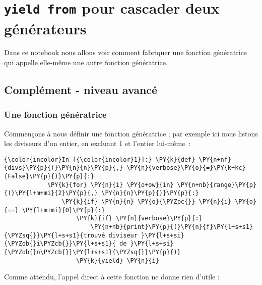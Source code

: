     
    
    
    

    

    \hypertarget{yield-from-pour-cascader-deux-guxe9nuxe9rateurs}{%
\section{\texorpdfstring{\texttt{yield\ from} pour cascader deux
générateurs}{yield from pour cascader deux générateurs}}\label{yield-from-pour-cascader-deux-guxe9nuxe9rateurs}}

    Dans ce notebook nous allons voir comment fabriquer une fonction
génératrice qui appelle elle-même une autre fonction génératrice.

    \hypertarget{compluxe9ment---niveau-avancuxe9}{%
\subsection{Complément - niveau
avancé}\label{compluxe9ment---niveau-avancuxe9}}

    \hypertarget{une-fonction-guxe9nuxe9ratrice}{%
\subsubsection{Une fonction
génératrice}\label{une-fonction-guxe9nuxe9ratrice}}

    Commençons à nous définir une fonction génératrice ; par exemple ici
nous listons les diviseurs d'un entier, en excluant 1 et l'entier
lui-même~:

    \begin{Verbatim}[commandchars=\\\{\}]
{\color{incolor}In [{\color{incolor}1}]:} \PY{k}{def} \PY{n+nf}{divs}\PY{p}{(}\PY{n}{n}\PY{p}{,} \PY{n}{verbose}\PY{o}{=}\PY{k+kc}{False}\PY{p}{)}\PY{p}{:}
            \PY{k}{for} \PY{n}{i} \PY{o+ow}{in} \PY{n+nb}{range}\PY{p}{(}\PY{l+m+mi}{2}\PY{p}{,} \PY{n}{n}\PY{p}{)}\PY{p}{:}
                \PY{k}{if} \PY{n}{n} \PY{o}{\PYZpc{}} \PY{n}{i} \PY{o}{==} \PY{l+m+mi}{0}\PY{p}{:}
                    \PY{k}{if} \PY{n}{verbose}\PY{p}{:} 
                        \PY{n+nb}{print}\PY{p}{(}\PY{n}{f}\PY{l+s+s1}{\PYZsq{}}\PY{l+s+s1}{trouvé diviseur }\PY{l+s+si}{\PYZob{}i\PYZcb{}}\PY{l+s+s1}{ de }\PY{l+s+si}{\PYZob{}n\PYZcb{}}\PY{l+s+s1}{\PYZsq{}}\PY{p}{)}
                    \PY{k}{yield} \PY{n}{i}
\end{Verbatim}


    Comme attendu, l'appel direct à cette fonction ne donne rien d'utile :

